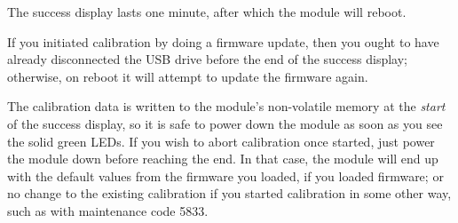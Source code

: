 
The success display lasts one minute, after which the module will reboot. 

If you initiated calibration by doing a firmware update, then you ought to
have already disconnected the USB drive before the end of the success
display; otherwise, on reboot it will attempt to update the firmware again. 

The calibration data is written to the module's non-volatile memory at the
\emph{start} of the success display, so it is safe to power down the module
as soon as you see the solid green LEDs.  If you wish to abort calibration
once started, just power the module down before reaching the end.  In that
case, the module will end up with the default values from the firmware you
loaded, if you loaded firmware; or no change to the existing calibration if
you started calibration in some other way, such as with maintenance code
5833.
